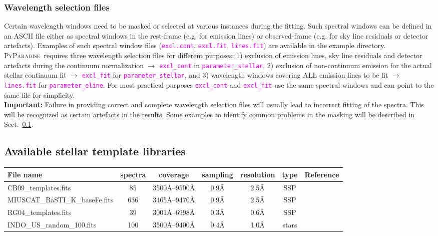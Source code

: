 \documentclass[usenatbib,usegraphicx,useAMS,onecolumn]{mn2e}
\newcommand{\codeline}[1]{\lstinline|#1|}
\newcommand{\fname}[1]{\textcolor{magenta}{\codeline{#1}}}
\newcommand{\PyPar}{\mbox{\textsc{PyParadise}}}
\begin{document}
\subsubsection{Wavelength selection files}
Certain wavelength windows need to be masked or selected at various instances during the fitting. Such spectral windows can be defined in an ASCII file either as spectral windows in the rest-frame (e.g. for emission lines) or observed-frame (e.g. for sky line residuals or detector artefacts). Examples of such spectral window files (\fname{excl.cont}, \fname{excl.fit}, \fname{lines.fit}) are available in the example directory.\bigskip\\

\PyPar\ requires three wavelength selection files for different purposes: 1) exclusion of emission lines, sky line residuals and detector artefacts during the continuum normalization $\rightarrow$ \fname{excl_cont} in \fname{parameter_stellar}, 2) exclusion of non-continuum emission for the actual stellar continuum fit $\rightarrow$ \fname{excl_fit} for \fname{parameter_stellar}, and 3) wavelength windows covering ALL emission lines to be fit $\rightarrow$ \fname{lines.fit} for \fname{parameter_eline}.  For most practical purposes \fname{excl_cont} and \fname{excl_fit} use the same spectral windows and can point to the same file for simplicity.\bigskip\\
\textbf{Important:} Failure in providing correct and complete wavelength selection files will usually lead to incorrect fitting of the spectra. This will be recognized as certain artefacts in the results. Some examples to identify common problems in the masking will be described in Sect.~\ref{}. 



\subsection{Available stellar template libraries}

\begin{tabular}{|l|c|c|c|c|c|c|}
 File name                     & spectra & coverage           & sampling & resolution & type & Reference\\\hline
 CB09\_templates.fits          &   85    &  3500\AA--9500\AA  & 0.9\AA   &  2.5\AA    & SSP  &          \\
 MIUSCAT\_BaSTI\_K\_baseFe.fits&   636   &  3465\AA--9470\AA  & 0.9\AA   &  2.5\AA    & SSP  &          \\
 RG04\_templates.fits          &    39   &  3001\AA--6998\AA  & 0.3\AA   &  0.6\AA    & SSP  &          \\
 INDO\_US\_random\_100.fits    &   100   &  3500\AA--9400\AA  & 0.4\AA   &  1.0\AA    & stars&    
\end{tabular}
\end{document}
